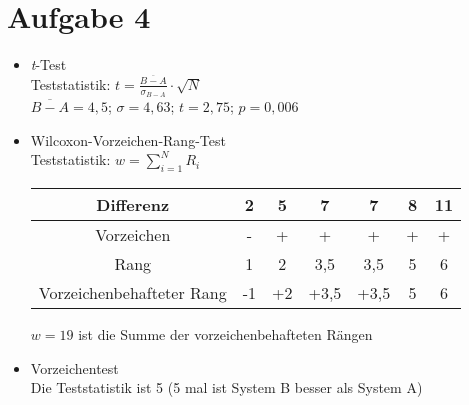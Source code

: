 \section*{Aufgabe 4}
\begin{itemize}
\item \textit{t}-Test\\
Teststatistik: $t = \frac{\overline{B - A}}{\sigma_{B-A}} \cdot \sqrt{N}$\\
$\overline{B-A} = 4,5 $; $\sigma = 4,63$; $t= 2,75$; $p = 0,006$
\item Wilcoxon-Vorzeichen-Rang-Test\\
Teststatistik: $w = \sum_{i=1}^N R_i$\\
\begin{center}
\begin{tabular}{|c|c|c|c|c|c|c|}
\hline 
Differenz & 2 & 5 & 7 & 7 & 8 & 11 \\ 
\hline 
Vorzeichen & - & + & + & + & + & + \\ 
\hline 
Rang & 1 & 2 & 3,5 & 3,5 & 5 & 6 \\ 
\hline 
Vorzeichenbehafteter Rang & -1 & +2 & +3,5 & +3,5 & 5 & 6 \\ 
\hline 
\end{tabular}
\end{center}
$w = 19$ ist die Summe der vorzeichenbehafteten Rängen
\item Vorzeichentest\\
Die Teststatistik ist 5 (5 mal ist System B besser als System A)\\
\end{itemize}